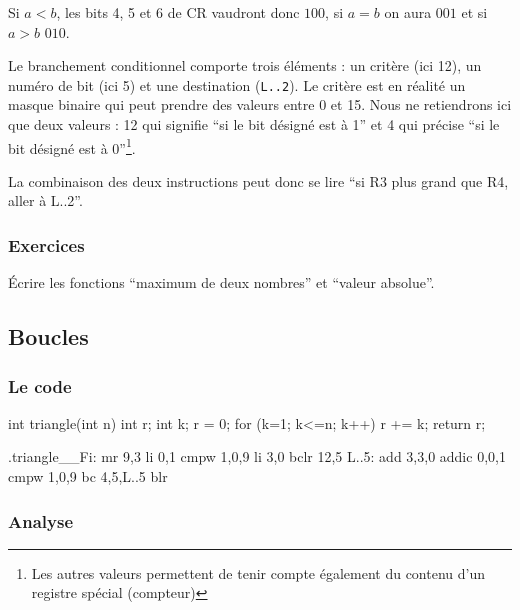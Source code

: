 \documentclass[10pt,twoside,a4paper]{article}
\begin{document}
\begin{multicols}{2}
Si $a<b$, les bits 4, 5 et 6 de CR vaudront donc $100$, si $a=b$ on aura
$001$ et si $a>b$ $010$.

Le branchement conditionnel comporte trois éléments : un critère (ici
12), un numéro de bit (ici 5) et une destination (\texttt{L..2}). Le
critère est en réalité un masque binaire qui peut prendre des valeurs
entre 0 et 15. Nous ne retiendrons ici que deux valeurs : 12 qui
signifie ``si le bit désigné est à 1'' et 4 qui précise ``si le bit
désigné est à 0''\footnote{Les autres valeurs permettent de tenir compte
également du contenu d'un registre spécial (compteur)}.

La combinaison des deux instructions peut donc se lire ``si
R3 plus grand que R4, aller à L..2''.

\subsubsection{Exercices}

Écrire les fonctions ``maximum de deux nombres'' et ``valeur absolue''.
 
\subsection{Boucles}

\subsubsection{Le code}

\begin{center}
\begin{boxedverbatim}
int triangle(int n)
{
  int r; 
  int k;
  r = 0;
  for (k=1; k<=n; k++)
     r += k;
  return r;
}
\end{boxedverbatim}
\end{center}


\begin{listing}{1}
.triangle__Fi:
        mr 9,3
        li 0,1
        cmpw 1,0,9
        li 3,0
        bclr 12,5
L..5:
        add 3,3,0
        addic 0,0,1
        cmpw 1,0,9
        bc 4,5,L..5
        blr
\end{listing}

\subsubsection{Analyse}


\end{multicols}
\end{document}
